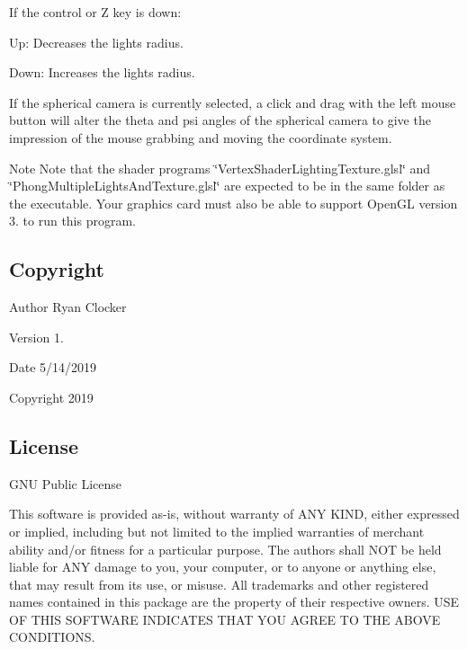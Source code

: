 If the control or Z key is down\+:


\begin{DoxyItemize}
\item Up\+: Decreases the light\textquotesingle{}s radius.
\item Down\+: Increases the light\textquotesingle{}s radius.
\end{DoxyItemize}

If the spherical camera is currently selected, a click and drag with the left mouse button will alter the theta and psi angles of the spherical camera to give the impression of the mouse grabbing and moving the coordinate system.

\begin{DoxyNote}{Note}
Note that the shader programs \char`\"{}\+Vertex\+Shader\+Lighting\+Texture.\+glsl\char`\"{} and \char`\"{}\+Phong\+Multiple\+Lights\+And\+Texture.\+glsl\char`\"{} are expected to be in the same folder as the executable. Your graphics card must also be able to support Open\+GL version 3. to run this program.
\end{DoxyNote}


\hypertarget{index_copyright}{}\subsection{Copyright}\label{index_copyright}
\begin{DoxyAuthor}{Author}
Ryan Clocker 
\end{DoxyAuthor}
\begin{DoxyVersion}{Version}
1. 
\end{DoxyVersion}
\begin{DoxyDate}{Date}
5/14/2019 
\end{DoxyDate}
\begin{DoxyCopyright}{Copyright}
2019
\end{DoxyCopyright}


\hypertarget{index_license}{}\subsection{License}\label{index_license}
G\+NU Public License

This software is provided as-\/is, without warranty of A\+NY K\+I\+ND, either expressed or implied, including but not limited to the implied warranties of merchant ability and/or fitness for a particular purpose. The authors shall N\+OT be held liable for A\+NY damage to you, your computer, or to anyone or anything else, that may result from its use, or misuse. All trademarks and other registered names contained in this package are the property of their respective owners. U\+SE OF T\+H\+IS S\+O\+F\+T\+W\+A\+RE I\+N\+D\+I\+C\+A\+T\+ES T\+H\+AT Y\+OU A\+G\+R\+EE TO T\+HE A\+B\+O\+VE C\+O\+N\+D\+I\+T\+I\+O\+NS. 